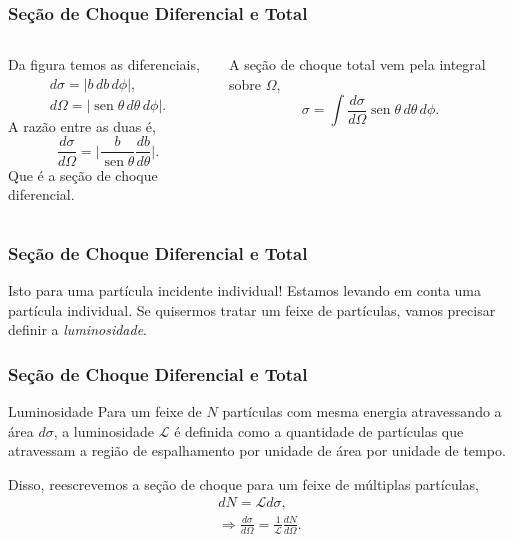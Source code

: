 \documentclass[xcolor=dvipsnames]{beamer}
\DeclareMathOperator*{\sen}{sen}
\begin{document}
\begin{frame}
	\frametitle{Seção de Choque Diferencial e Total}

	\begin{columns}
	Da figura temos as diferenciais,
	\begin{gather}
		d\sigma = |b\, db\, d\phi|,\\
		d\Omega = |\sen \theta \, d\theta \, d\phi|.
	\end{gather}
	A razão entre as duas é,
	\begin{equation}
		\frac{d\sigma}{d\Omega} = \bigg| \frac{b}{\sen \theta}
		\frac{db}{d\theta} \bigg|. \label{diff_cross_section}
	\end{equation}
	Que é a seção de choque diferencial.

	A seção de choque total vem pela integral sobre $\Omega$,
	\begin{equation}
		\sigma = \int \frac{d\sigma}{d\Omega} \sen \theta \, d\theta \, d\phi .
	\end{equation}

	\end{columns}

\end{frame}

\begin{frame}
	\frametitle{Seção de Choque Diferencial e Total}
	\begin{block}{Isto para uma partícula incidente individual!}
		Estamos levando em conta uma partícula individual. Se quisermos tratar
		um feixe de partículas, vamos precisar definir a \textit{luminosidade}.
	\end{block}

\end{frame}

\begin{frame}
	\frametitle{Seção de Choque Diferencial e Total}
	\begin{block}{Luminosidade}
		Para um feixe de $N$ partículas com mesma energia atravessando a área
		$d\sigma$, a luminosidade $\mathcal{L}$ é definida como a quantidade
		de partículas que atravessam a região de espalhamento por unidade de
		área por unidade de tempo.
	\end{block}
	Disso, reescrevemos a seção de choque para um feixe de múltiplas partículas,
	\begin{gather}
		dN = \mathcal{L} d\sigma, \\
		\Rightarrow \frac{d\sigma}{d\Omega} = \frac{1}{\mathcal{L}}
		\frac{dN}{d\Omega}.
	\end{gather}
\end{frame}
\end{document}
